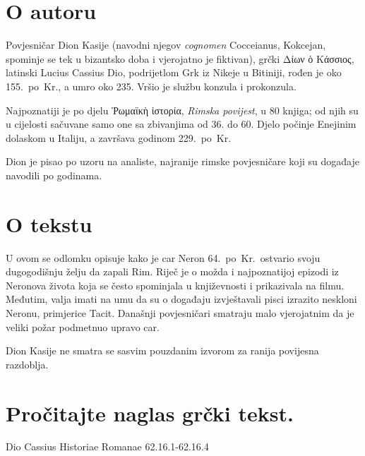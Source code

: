 \section*{O autoru}

Povjesničar Dion Kasije (navodni njegov \textit{cognomen} Cocceianus, Kokcejan, spominje se tek u bizantsko doba i vjerojatno je fiktivan), grčki \textgreek[variant=ancient]{Δίων ὁ Κάσσιος,} latinski Lucius Cassius Dio, podrijetlom Grk iz Nikeje u Bitiniji, rođen je oko 155.\ po~Kr., a umro oko 235. Vršio je službu konzula i prokonzula.

Najpoznatiji je po djelu \textgreek[variant=ancient]{Ῥωμαϊκὴ ἱστορία}, \textit{Rimska povijest}, u 80 knjiga; od njih su u cijelosti sačuvane samo one sa zbivanjima od 36. do 60. Djelo počinje Enejinim dolaskom u Italiju, a završava godinom 229.\ po~Kr. 

Dion je pisao po uzoru na analiste, najranije rimske povjesničare koji su događaje navodili po godinama.

\section*{O tekstu}

U ovom se odlomku opisuje kako je car Neron 64.\ po~Kr.\ ostvario svoju dugogodišnju želju da zapali Rim. Riječ je o možda i najpoznatijoj epizodi iz Neronova života koja se često spominjala u književnosti i prikazivala na filmu. Međutim, valja imati na umu da su o događaju izvještavali pisci izrazito neskloni Neronu, primjerice Tacit. Današnji povjesničari smatraju malo vjerojatnim da je veliki požar podmetnuo upravo car.

Dion Kasije ne smatra se sasvim pouzdanim izvorom za ranija povijesna razdoblja. 

\newpage

\section*{Pročitajte naglas grčki tekst.}

Dio Cassius Historiae Romanae 62.16.1-62.16.4

\medskip



